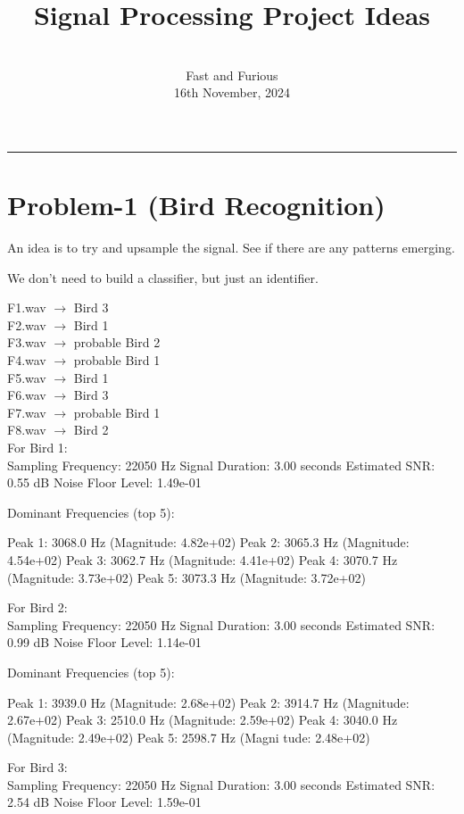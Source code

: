 \documentclass[a4paper,12pt]{article}
\title{Signal Processing Project Ideas}
\author{\\[-5ex] \large Fast and Furious \\16th November, 2024}
\date{}
\begin{document}
\maketitle
\par\noindent\rule{\textwidth}{0.4pt}

\section*{Problem-1 (Bird Recognition)}

An idea is to try and upsample the signal. See if there are any patterns emerging. 

We don't need to build a classifier, but just an identifier.

F1.wav $\rightarrow$ Bird 3 \\
F2.wav $\rightarrow$ Bird 1 \\
F3.wav $\rightarrow$ probable Bird 2 \\
F4.wav $\rightarrow$ probable Bird 1 \\
F5.wav $\rightarrow$ Bird 1 \\
F6.wav $\rightarrow$ Bird 3 \\
F7.wav $\rightarrow$ probable Bird 1 \\
F8.wav $\rightarrow$ Bird 2 \\

For Bird 1: \\
Sampling Frequency: 22050 Hz
Signal Duration: 3.00 seconds
Estimated SNR: 0.55 dB
Noise Floor Level: 1.49e-01

Dominant Frequencies (top 5):

Peak 1: 3068.0 Hz (Magnitude: 4.82e+02)
Peak 2: 3065.3 Hz (Magnitude: 4.54e+02)
Peak 3: 3062.7 Hz (Magnitude: 4.41e+02)
Peak 4: 3070.7 Hz (Magnitude: 3.73e+02)
Peak 5: 3073.3 Hz (Magnitude: 3.72e+02)

For Bird 2: \\
Sampling Frequency: 22050 Hz
Signal Duration: 3.00 seconds
Estimated SNR: 0.99 dB
Noise Floor Level: 1.14e-01

Dominant Frequencies (top 5):

Peak 1: 3939.0 Hz (Magnitude: 2.68e+02)
Peak 2: 3914.7 Hz (Magnitude: 2.67e+02)
Peak 3: 2510.0 Hz (Magnitude: 2.59e+02)
Peak 4: 3040.0 Hz (Magnitude: 2.49e+02)
Peak 5: 2598.7 Hz (Magni    tude: 2.48e+02)

For Bird 3: \\
Sampling Frequency: 22050 Hz
Signal Duration: 3.00 seconds
Estimated SNR: 2.54 dB
Noise Floor Level: 1.59e-01
\end{document}
